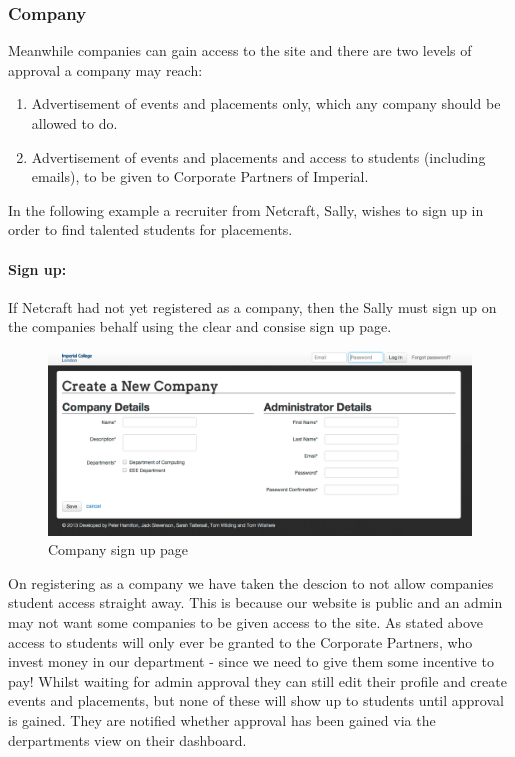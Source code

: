 \subsubsection{Company}
Meanwhile companies can gain access to the site and there are two levels of approval a company may reach:
  \begin{enumerate}
    \item Advertisement of events and placements only, which any company should be allowed to do.
    \item Advertisement of events and placements and access to students (including emails), to be given to Corporate Partners of Imperial.
  \end{enumerate} 
  In the following example a recruiter from Netcraft, Sally, wishes to sign up in order to find talented students for placements.
  \paragraph{Sign up:}
    If Netcraft had not yet registered as a company, then the Sally must sign up on the companies behalf using the clear and consise sign up page.

    \begin{figure}[H]\centering
    \includegraphics[scale=0.3]{images/user_experiences/company/company_signup}
    \caption{Company sign up page}
    \end{figure}

    On registering as a company we have taken the descion to not allow companies student access straight away. This is because our website is public and an admin may not want some companies to be given access to the site. As stated above access to students will only ever be granted to the Corporate Partners, who invest money in our department - since we need to give them some incentive to pay!
    Whilst waiting for admin approval they can still edit their profile and create events and placements, but none of these will show up to students until approval is gained. They are notified whether approval has been gained via the derpartments view on their dashboard.


